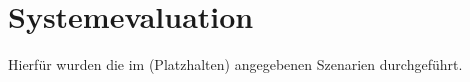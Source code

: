 \section{Systemevaluation}

Hierfür wurden die im (Platzhalten) angegebenen Szenarien durchgeführt. 